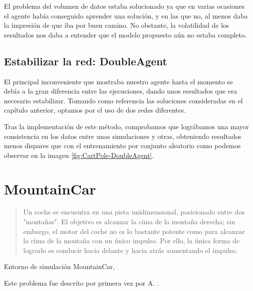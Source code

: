 El problema del volumen de datos estaba solucionado ya que en varias ocasiones el agente había conseguido aprender una solución, y en las que no, al menos daba la impresión de que iba por buen camino. No obstante, la volatilidad de los resultados nos daba a entender que el modelo propuesto aún no estaba completo.


\subsection{Estabilizar la red: DoubleAgent}

El principal inconveniente que mostraba nuestro agente hasta el momento se debía a la gran diferencia entre las ejecuciones, dando unos resultados que era necesario estabilizar. Tomando como referencia las soluciones consideradas en el capítulo anterior, optamos por el uso de dos redes diferentes. 

Tras la implementación de este método, comprobamos que lográbamos una mayor consistencia en los datos entre unas simulaciones y otras, obteniendo resultados menos dispares que con el entrenamiento por conjunto aleatorio como podemos observar en la imagen \ref{fig:CartPole-DoubleAgent}.


\section{MountainCar}

\begin{quote}
    Un coche se encuentra en una pista unidimensional, posicionado entre dos "montañas". El objetivo es alcanzar la cima de la montaña derecha; sin embargo, el motor del coche no es lo bastante potente como para alcanzar la cima de la montaña con un único impulso. Por ello, la única forma de lograrlo es conducir hacia delante y hacia atrás aumentando el impulso.
\end{quote}

%
       {Entorno de simulación MountainCar, \citet{brockman2016openai}}

Este problema fue descrito por primera vez por A. \citet{Moore90efficientmemory-based}.

